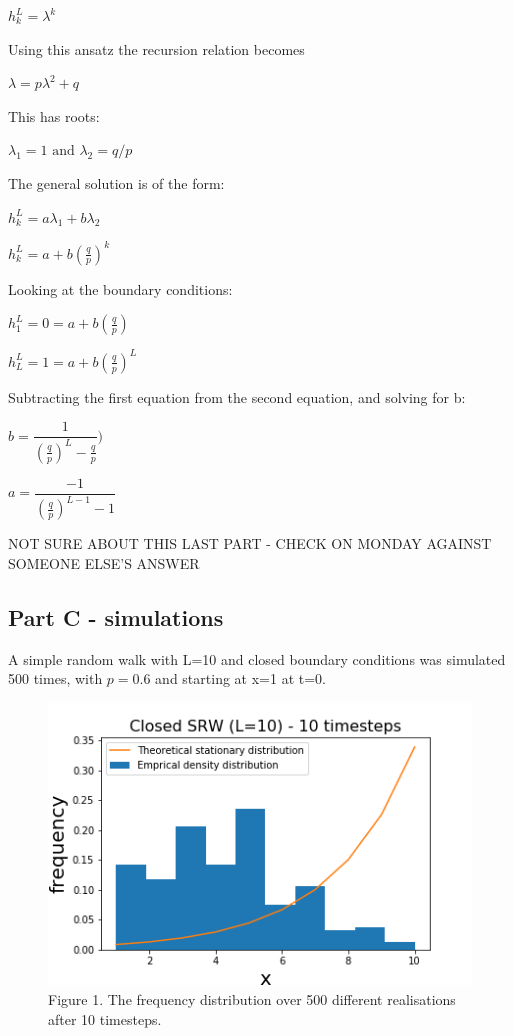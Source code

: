 \documentclass{article}
\begin{document}
$h_{k}^L = \lambda^k $

Using this ansatz the recursion relation becomes

$\lambda = p \lambda^2 + q$

This has roots:

$\lambda_1 = 1 \text{ and } \lambda_2 = q/p$



The general solution is of the form:

$h_k^L = a\lambda_1 + b\lambda_2$ 

$h_k^L = a + b(\frac{q}{p})^k$ 


Looking at the boundary conditions:

$h_1^L = 0 = a + b(\frac{q}{p})$

$h_L^L = 1 = a + b(\frac{q}{p})^L$

Subtracting the first equation from the second equation, and solving for b:

$b = \dfrac{1}{(\frac{q}{p})^{L}-\frac{q}{p}})$

$a = \dfrac{-1}{(\frac{q}{p})^{L-1}-1}$

NOT SURE ABOUT THIS LAST PART - CHECK ON MONDAY AGAINST SOMEONE ELSE'S ANSWER

\subsection{Part C - simulations}

A simple random walk with L=10 and closed boundary conditions was simulated 500 times, with $p=0.6$ and starting at x=1 at t=0.

\begin{figure}[H]
\includegraphics[scale=1]{10_steps_a.png} 
\small{Figure 1. The frequency distribution over 500 different realisations after 10 timesteps.}
\end{figure}
\end{document}
